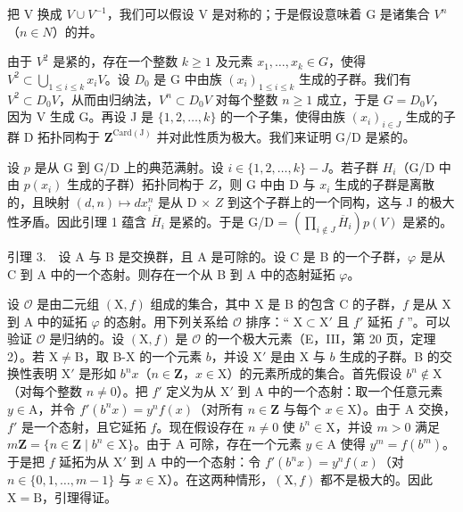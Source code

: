 把 V 换成 \(V \cup V^{-1}\)，我们可以假设 V 是对称的；于是假设意味着 G 是诸集合 \(V^{n}\)（\(n \in N\)）的并。

由于 \(V^{2}\) 是紧的，存在一个整数 \(k \geqslant 1\) 及元素 \(x_{1}, \ldots, x_{k} \in G\)，使得 \(V^{2} \subset \bigcup_{1 \leqslant i \leqslant k} x_{i}V\)。设 \(D_{0}\) 是 G 中由族 \((x_{i})_{1 \leqslant i \leqslant k}\) 生成的子群。我们有 \(V^{2} \subset D_{0}V\)，从而由归纳法，\(V^{n} \subset D_{0}V\) 对每个整数 \(n \geqslant 1\) 成立，于是 \(G = D_{0}V\)，因为 V 生成 G。再设 J 是 \(\{1, 2, \ldots, k\}\) 的一个子集，使得由族 \((x_{i})_{i \in J}\) 生成的子群 D 拓扑同构于 \(\mathbf{Z}^{\mathrm{Card(J)}}\) 并对此性质为极大。我们来证明 G/D 是紧的。

设 \(p\) 是从 G 到 G/D 上的典范满射。设 \(i \in \{1, 2, \ldots, k\} - J\)。若子群 \(H_i\)（G/D 中由 \(p(x_i)\) 生成的子群）拓扑同构于 \(Z\)，则 G 中由 D 与 \(x_i\) 生成的子群是离散的，且映射 \((d, n) \mapsto dx_i^n\) 是从 D × \(Z\) 到这个子群上的一个同构，这与 J 的极大性矛盾。因此引理 1 蕴含 \(\overline{H}_i\) 是紧的。于是 G/D = \((\prod_{i \not\in J} \overline{H}_i)p(V)\) 是紧的。

引理 3.　设 A 与 B 是交换群，且 A 是可除的。设 C 是 B 的一个子群，\(\varphi\) 是从 C 到 A 中的一个态射。则存在一个从 B 到 A 中的态射延拓 \(\varphi\)。

设 \(\mathcal{O}\) 是由二元组 \((\mathrm{X},f)\) 组成的集合，其中 \(\mathrm{X}\) 是 B 的包含 C 的子群，\(f\) 是从 \(\mathrm{X}\) 到 A 中的延拓 \(\varphi\) 的态射。用下列关系给 \(\mathcal{O}\) 排序：“ \(\mathrm{X} \subset \mathrm{X}'\) 且 \(f'\) 延拓 \(f\) ”。可以验证 \(\mathcal{O}\) 是归纳的。设 \((\mathrm{X},f)\) 是 \(\mathcal{O}\) 的一个极大元素（E，III，第 20 页，定理 2）。若 \(\mathrm{X} \neq \mathrm{B}\)，取 B-X 的一个元素 \(b\)，并设 \(\mathrm{X}'\) 是由 \(\mathrm{X}\) 与 \(b\) 生成的子群。B 的交换性表明 \(\mathrm{X}'\) 是形如 \(b^n x\)（\(n \in \mathbf{Z}\)，\(x \in \mathrm{X}\)）的元素所成的集合。首先假设 \(b^n \notin \mathrm{X}\)（对每个整数 \(n \neq 0\)）。把 \(f'\) 定义为从 \(\mathrm{X}'\) 到 A 中的一个态射：取一个任意元素 \(y \in \mathrm{A}\)，并令 \(f'(b^n x) = y^n f(x)\)（对所有 \(n \in \mathbf{Z}\) 与每个 \(x \in \mathrm{X}\)）。由于 A 交换，\(f'\) 是一个态射，且它延拓 \(f\)。现在假设存在 \(n \neq 0\) 使 \(b^n \in \mathrm{X}\)，并设 \(m > 0\) 满足 \(m\mathbf{Z} = \{n \in \mathbf{Z} \mid b^n \in \mathrm{X}\}\)。由于 A 可除，存在一个元素 \(y \in \mathrm{A}\) 使得 \(y^m = f(b^m)\)。于是把 \(f\) 延拓为从 \(\mathrm{X}'\) 到 A 中的一个态射：令 \(f'(b^n x) = y^n f(x)\)（对 \(n \in \{0,1,\ldots,m-1\}\) 与 \(x \in \mathrm{X}\)）。在这两种情形，\((\mathrm{X},f)\) 都不是极大的。因此 \(\mathrm{X} = \mathrm{B}\)，引理得证。

